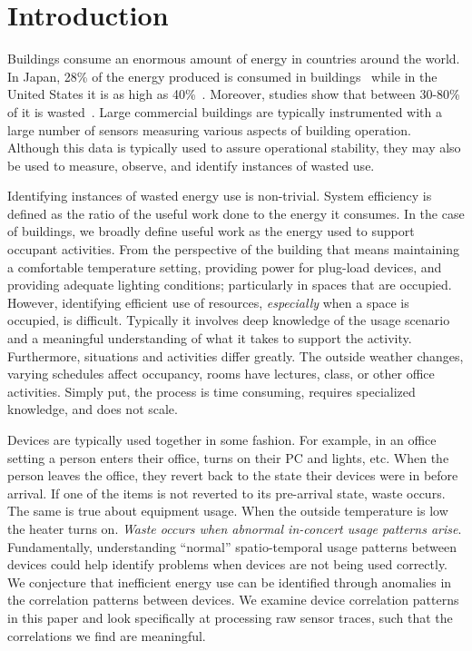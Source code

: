 \section{Introduction}
Buildings consume an enormous amount of energy in countries around the world.  In 
Japan, 28\% of the energy produced is consumed in buildings~\cite{japanbuildings} while in the United 
States it is as high as 40\%~\cite{epabuildings}.  Moreover, studies show that between 30-80\% of it
is wasted~\cite{waste_science, next10_waste}.  Large commercial buildings are typically instrumented
with a large number of sensors measuring various aspects of building operation.  Although this data is
typically used to assure operational stability, they may also be used to measure, observe, and identify
instances of wasted use.

Identifying instances of wasted energy use is non-trivial.  System efficiency is defined as the ratio of the 
useful work done to the energy it consumes.  In the case of buildings, we broadly define useful work as 
the energy used to support occupant activities.  From the perspective of the building that means maintaining
a comfortable temperature setting, providing power for plug-load devices, and providing adequate lighting
conditions; particularly in spaces that are occupied.  However, identifying efficient use of resources,
\emph{especially} when a space is occupied, is difficult.  Typically it involves deep knowledge of the usage scenario and
a meaningful understanding of what it takes to support the activity.  Furthermore, situations and activities differ
greatly.  The outside weather changes, varying schedules affect occupancy, rooms have lectures, class,
or other office activities.  Simply put, the process is time consuming, requires specialized knowledge,
and does not scale.

Devices are typically used together in some fashion.  For example, in an office
setting a person enters their office, turns on their PC and lights, etc.
When the person leaves the office, they revert back to the state their devices were in before arrival.
If one of the items is not reverted to its pre-arrival state, waste occurs. 
The same is true about equipment usage.  When the outside temperature is low the heater turns on.
\emph{Waste occurs when abnormal in-concert usage patterns arise}.  
Fundamentally, understanding ``normal'' spatio-temporal usage patterns between devices could help
identify problems when devices are not being used correctly.
We conjecture that inefficient energy use can be identified through anomalies in the correlation
patterns between devices.  We examine device correlation patterns in this paper and look specifically
at processing raw sensor traces, such that the correlations we find are meaningful.

